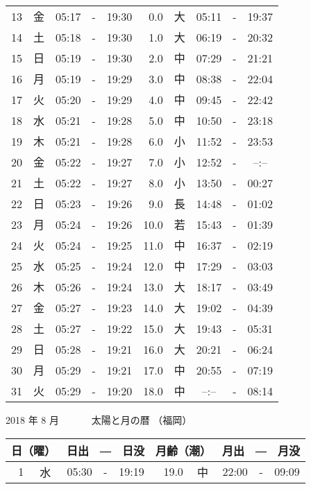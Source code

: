 \documentclass[a4j,10pt]{jsarticle}
\begin{document}
\begin{center}
\begin{table}[ht]
\begin{center}
\begin{tabular}{|rc|ccc|rc|ccc|}
 13 & 金 & 05:17 &-& 19:30 &  0.0 & 大 & 05:11 &-& 19:37 \\
 14 & 土 & 05:18 &-& 19:30 &  1.0 & 大 & 06:19 &-& 20:32 \\
 15 & 日 & 05:19 &-& 19:30 &  2.0 & 中 & 07:29 &-& 21:21 \\
 16 & 月 & 05:19 &-& 19:29 &  3.0 & 中 & 08:38 &-& 22:04 \\
 17 & 火 & 05:20 &-& 19:29 &  4.0 & 中 & 09:45 &-& 22:42 \\
 18 & 水 & 05:21 &-& 19:28 &  5.0 & 中 & 10:50 &-& 23:18 \\
 19 & 木 & 05:21 &-& 19:28 &  6.0 & 小 & 11:52 &-& 23:53 \\
 20 & 金 & 05:22 &-& 19:27 &  7.0 & 小 & 12:52 &-&  --:--  \\
 21 & 土 & 05:22 &-& 19:27 &  8.0 & 小 & 13:50 &-& 00:27 \\
 22 & 日 & 05:23 &-& 19:26 &  9.0 & 長 & 14:48 &-& 01:02 \\
 23 & 月 & 05:24 &-& 19:26 & 10.0 & 若 & 15:43 &-& 01:39 \\
 24 & 火 & 05:24 &-& 19:25 & 11.0 & 中 & 16:37 &-& 02:19 \\
 25 & 水 & 05:25 &-& 19:24 & 12.0 & 中 & 17:29 &-& 03:03 \\
 26 & 木 & 05:26 &-& 19:24 & 13.0 & 大 & 18:17 &-& 03:49 \\
 27 & 金 & 05:27 &-& 19:23 & 14.0 & 大 & 19:02 &-& 04:39 \\
 28 & 土 & 05:27 &-& 19:22 & 15.0 & 大 & 19:43 &-& 05:31 \\
 29 & 日 & 05:28 &-& 19:21 & 16.0 & 大 & 20:21 &-& 06:24 \\
 30 & 月 & 05:29 &-& 19:21 & 17.0 & 中 & 20:55 &-& 07:19 \\
 31 & 火 & 05:29 &-& 19:20 & 18.0 & 中 &  --:--  &-& 08:14 \\
    \hline
    \end{tabular}
    \end{center}
\end{table}
\newpage
  {\large 2018 年  8 月}
  {\Large 　　　太陽と月の暦   （福岡） }
  \begin{table}[ht]
  \begin{center}
     \begin{tabular}{|rc|ccc|rc|ccc|}
     \hline
     \multicolumn{2}{|c|}{日（曜）} & \multicolumn{3}{c|}{日出　―　日没} & \multicolumn{2}{c|}{月齢（潮）} & \multicolumn{3}{c|}{月出　―　月没}\\
     \hline
  1 & 水 & 05:30 &-& 19:19 & 19.0 & 中 & 22:00 &-& 09:09 \\

\end{tabular}
\end{center}
\end{table}
\end{center}
\end{document}
